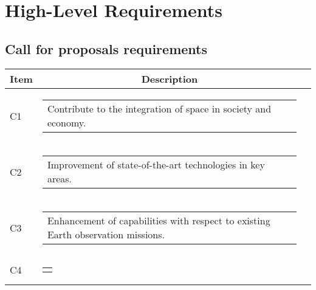 \newpage
\section{High-Level Requirements}

\subsection{Call for proposals requirements}
\begin{longtable}[H]{l c c}
	\toprule[2pt]
	\textbf{Item} &  \textbf{Description}                                                                                                                                               \\ \midrule
	C1 & \begin{tabular}[c]{@{}l@{}}\begin{minipage}[t]{\linewidth}
Contribute to the integration of space in society and economy. \vspace{0.3cm}
	\end{minipage} \end{tabular}                                                                                                                                            \\ \hline
	C2 & \begin{tabular}[c]{@{}l@{}}\begin{minipage}[t]{\linewidth}
			Improvement of state-of-the-art technologies in key areas. \vspace{0.3cm}
	\end{minipage} \end{tabular}                                                                                                                                            \\  \midrule
	C3 & \begin{tabular}[c]{@{}l@{}}\begin{minipage}[t]{\linewidth}
Enhancement of capabilities with respect to existing Earth observation missions. \vspace{0.3cm}
	\end{minipage} \end{tabular}                                                                                                                                          \\  \midrule
	C4 & \begin{tabular}[c]{@{}l@{}}\begin{minipage}[t]{\linewidth}

\end{minipage}
\end{tabular}
\end{longtable}
